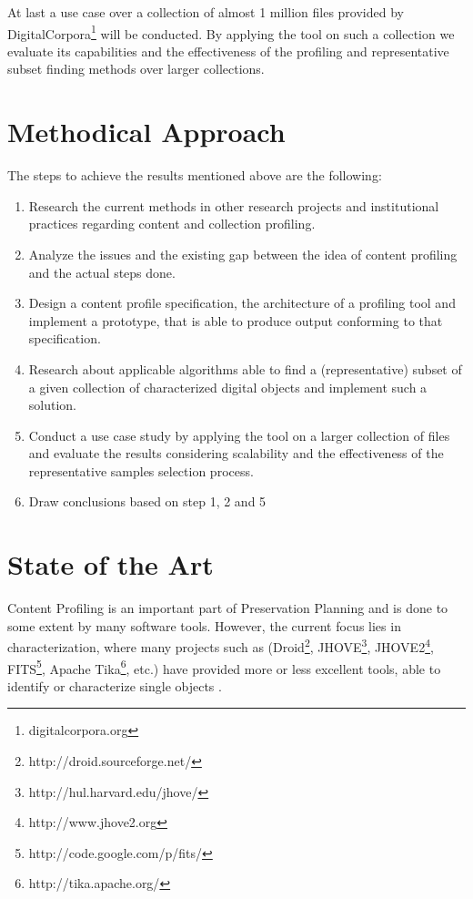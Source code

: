 \documentclass[a4paper,12pt]{scrartcl} %
\begin{document}
At last a use case over a collection of almost 1 million files provided by DigitalCorpora\footnote{digitalcorpora.org} will be conducted. By applying the tool on such a collection we evaluate its capabilities and the effectiveness of the profiling and representative subset finding methods over larger collections.

\section*{Methodical Approach}
The steps to achieve the results mentioned above are the following:
\begin{enumerate}[itemsep=2pt, parsep=2pt]
\item Research the current methods in other research projects and institutional practices regarding content and collection profiling.
\item Analyze the issues and the existing gap between the idea of content profiling and the actual steps done.
\item Design a content profile specification, the architecture of a profiling tool and implement a prototype, that is able to produce output conforming to that specification.
\item Research about applicable algorithms able to find a (representative) subset of a given collection of characterized digital objects and implement such a solution.
\item Conduct a use case study by applying the tool on a larger collection of files and evaluate the results considering scalability and the effectiveness of the representative samples selection process.
\item Draw conclusions based on step 1, 2 and 5
\end{enumerate}

\section*{State of the Art}
Content Profiling is an important part of Preservation Planning and is done to some extent by many software tools. However, the current focus lies in characterization, where many projects such as (Droid\footnote{http://droid.sourceforge.net/}, JHOVE\footnote{http://hul.harvard.edu/jhove/}, JHOVE2\footnote{http://www.jhove2.org}, FITS\footnote{http://code.google.com/p/fits/}, Apache Tika\footnote{http://tika.apache.org/}, etc.) have provided more or less excellent tools, able to identify or characterize single objects \cite{Knijff:2011it}. 
\end{document}
